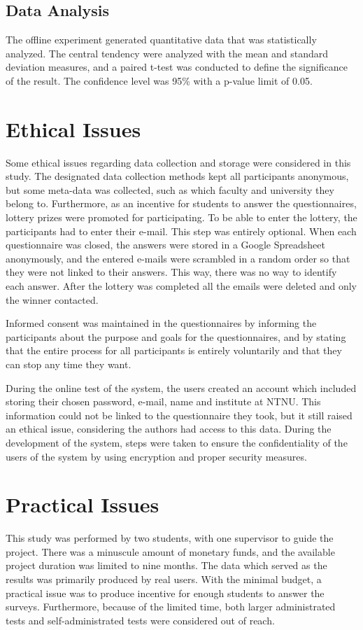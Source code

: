 \subsection*{Data Analysis}
The offline experiment generated quantitative data that was statistically analyzed. The central tendency were analyzed with the mean and standard deviation measures, and a paired t-test was conducted to define the significance of the result. The confidence level was 95\% with a p-value limit of 0.05.

\section{Ethical Issues}
Some ethical issues regarding data collection and storage were considered in this study. The designated data collection methods kept all participants anonymous, but some meta-data was collected, such as which faculty and university they belong to. Furthermore, as an incentive for students to answer the questionnaires, lottery prizes were promoted for participating. To be able to enter the lottery, the participants had to enter their e-mail. This step was entirely optional. When each questionnaire was closed, the answers were stored in a Google Spreadsheet anonymously, and the entered e-mails were scrambled in a random order so that they were not linked to their answers. This way, there was no way to identify each answer. After the lottery was completed all the emails were deleted and only the winner contacted. 

Informed consent was maintained in the questionnaires by informing the participants about the purpose and goals for the questionnaires, and by stating that the entire process for all participants is entirely voluntarily and that they can stop any time they want.

During the online test of the system, the users created an account which included storing their chosen password, e-mail, name and institute at NTNU. This information could not be linked to the questionnaire they took, but it still raised an ethical issue, considering the authors had access to this data. During the development of the system, steps were taken to ensure the confidentiality of the users of the system by using encryption and proper security measures.


\section{Practical Issues}
This study was performed by two students, with one supervisor to guide the project. There was a minuscule amount of monetary funds, and the available project duration was limited to nine months. The data which served as the results was primarily produced by real users. With the minimal budget, a practical issue was to produce incentive for enough students to answer the surveys. Furthermore, because of the limited time, both larger administrated tests and self-administrated tests were considered out of reach.

\cleardoublepage




